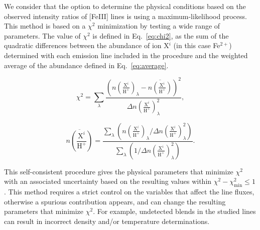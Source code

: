 \documentclass[fleqn,usenatbib]{mnras}
\begin{document}
We consider that the option to determine the physical conditions based on the observed intensity ratios of  [Fe\thinspace III] lines is using a maximum-likelihood process. This method is based on a $\chi^{2}$ minimization by testing a wide range of parameters. The value of $\chi^{2}$ is defined in Eq.~\eqref{eq:chi2}, as the sum of the quadratic differences between the abundance of ion X$^i$ (in this case Fe$^{2+}$) determined with each emission line included in the procedure and the weighted average of the abundance defined in Eq.~\eqref{eq:average}. 

\begin{equation}
    \label{eq:chi2}
    \chi^2=\sum_{\lambda} \frac{\left(n\left( \frac{\text{X}^{i}}{\text{H}^{+}} \right)_{\lambda}-\overline{n\left( \frac{\text{X}^{i}}{\text{H}^{+}} \right)} \right)^2}{  \Delta n\left( \frac{\text{X}^{i}}{\text{H}^{+}} \right)_{\lambda} ^{2} },
\end{equation}

\begin{equation}
    \label{eq:average}
    \overline{n\left( \frac{\text{X}^{i}}{\text{H}^{+}} \right)}= \frac{ \sum_{\lambda} \left( n\left( \frac{\text{X}^{i}}{\text{H}^{+}} \right)_{\lambda}/ \Delta n\left( \frac{\text{X}^{i}}{\text{H}^{+}} \right)_{\lambda}^2  \right)   }{ \sum_{\lambda} \left( 1/ \Delta n\left( \frac{\text{X}^{i}}{\text{H}^{+}} \right)_{\lambda}^2  \right) }.
\end{equation}

This self-consistent procedure gives the physical parameters that minimize $\chi^2$ with an associated uncertainty based on the resulting values within $\chi^2-\chi^2_{\text{min}}\leq 1$. This method requires a strict control on the variables that affect the line fluxes, otherwise a spurious contribution appears, and can change the resulting parameters that minimize $\chi^2$. For example, undetected blends in the studied lines can result in incorrect density and/or temperature determinations. 
\end{document}
